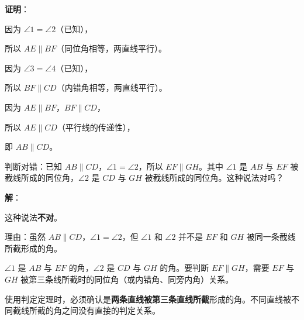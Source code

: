 \documentclass[12pt, a4paper]{ctexart}
\begin{document}
\begin{center}
\end{center}

\textbf{证明}：

因为 $\angle 1 = \angle 2$（已知），

所以 $AE \parallel BF$（同位角相等，两直线平行）。

因为 $\angle 3 = \angle 4$（已知），

所以 $BF \parallel CD$（内错角相等，两直线平行）。

因为 $AE \parallel BF$，$BF \parallel CD$，

所以 $AE \parallel CD$（平行线的传递性），

即 $AB \parallel CD$。

\vspace{6pt}

\begin{examplebox}
判断对错：已知 $AB \parallel CD$，$\angle 1 = \angle 2$，所以 $EF \parallel GH$。其中 $\angle 1$ 是 $AB$ 与 $EF$ 被截线所成的同位角，$\angle 2$ 是 $CD$ 与 $GH$ 被截线所成的同位角。这种说法对吗？
\end{examplebox}

\textbf{解}：

这种说法\textbf{不对}。

理由：虽然 $AB \parallel CD$，$\angle 1 = \angle 2$，但 $\angle 1$ 和 $\angle 2$ 并不是 $EF$ 和 $GH$ 被同一条截线所截形成的角。

$\angle 1$ 是 $AB$ 与 $EF$ 的角，$\angle 2$ 是 $CD$ 与 $GH$ 的角。要判断 $EF \parallel GH$，需要 $EF$ 与 $GH$ 被第三条线所截时的同位角（或内错角、同旁内角）关系。

\begin{warnbox}[关键提醒]
使用判定定理时，必须确认是\textbf{两条直线被第三条直线所截}形成的角。不同直线被不同截线所截的角之间没有直接的判定关系。
\end{warnbox}
\end{document}
